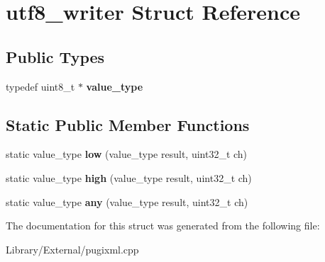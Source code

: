 \hypertarget{structutf8__writer}{}\section{utf8\+\_\+writer Struct Reference}
\label{structutf8__writer}
\subsection*{Public Types}
\begin{DoxyCompactItemize}
\item 
\hypertarget{structutf8__writer_af25ec3c651f9a4a3f193573a4e95002b}{}typedef uint8\+\_\+t $\ast$ {\bfseries value\+\_\+type}\label{structutf8__writer_af25ec3c651f9a4a3f193573a4e95002b}

\end{DoxyCompactItemize}
\subsection*{Static Public Member Functions}
\begin{DoxyCompactItemize}
\item 
\hypertarget{structutf8__writer_ac4ec52da6f37225ba4fde259bff2f86c}{}static value\+\_\+type {\bfseries low} (value\+\_\+type result, uint32\+\_\+t ch)\label{structutf8__writer_ac4ec52da6f37225ba4fde259bff2f86c}

\item 
\hypertarget{structutf8__writer_ac03dfaf797d599afdf0be7def86ff9b9}{}static value\+\_\+type {\bfseries high} (value\+\_\+type result, uint32\+\_\+t ch)\label{structutf8__writer_ac03dfaf797d599afdf0be7def86ff9b9}

\item 
\hypertarget{structutf8__writer_a288e9c5f3720b95ae6b77330ad38dd56}{}static value\+\_\+type {\bfseries any} (value\+\_\+type result, uint32\+\_\+t ch)\label{structutf8__writer_a288e9c5f3720b95ae6b77330ad38dd56}

\end{DoxyCompactItemize}


The documentation for this struct was generated from the following file\+:\begin{DoxyCompactItemize}
\item 
Library/\+External/pugixml.\+cpp\end{DoxyCompactItemize}
